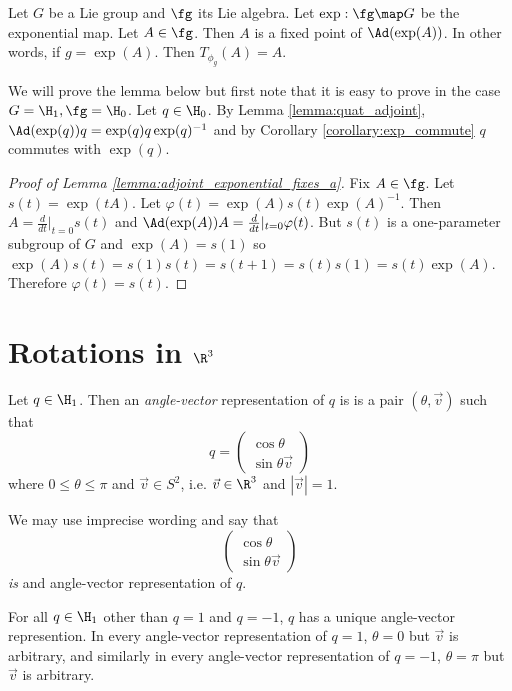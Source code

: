 \documentclass[oneside,12pt]{amsart}
\begin{document}
\begin{lemma}
\label{lemma:adjoint_exponential_fixes_a}
Let $G$ be a Lie group and $\fg$ its Lie algebra. Let $\exp:\fg\map G$ be the exponential map.
Let $A\in \fg$. Then $A$ is a fixed point of $\Ad(\exp(A))$.
In other words, if $g=\exp(A)$. Then $T_{\phi_g}(A) = A$. 
\end{lemma}

We will prove the lemma below but first note that it is easy to prove in the case
$G=\H_1, \fg = \H_0$.  Let $q\in\H_0$.
By Lemma \ref{lemma:quat_adjoint}, $\Ad(\exp(q))q = \exp(q) q  \exp(q)^{-1}$ and by
Corollary \ref{corollary:exp_commute} $q$ commutes with $\exp(q)$. 

\begin{proof}[Proof of Lemma \ref{lemma:adjoint_exponential_fixes_a}]
Fix $A\in\fg$. Let $s(t) = \exp(tA)$. Let $\varphi(t) = \exp(A) s(t) \exp(A)^{-1}$.
Then $A = \frac{d}{dt}\vert_{t=0} s(t)$ and $\Ad(\exp(A)) A = \frac{d}{dt}\vert_{t=0} \varphi(t)$.
But $s(t)$ is a one-parameter subgroup of $G$ and $\exp(A)=s(1)$ so $\exp(A) s(t) = s(1)s(t) = s(t+1) = s(t)s(1) = s(t)\exp(A)$. Therefore $\varphi(t)=s(t)$.
\end{proof}

\section{Rotations in $\R^3$}
\begin{definition}
Let $q\in\H_1$. Then an \emph{angle-vector} representation of $q$ is is a pair $(\theta,\vec{v})$ such that
$$q = \begin{pmatrix} \cos \theta \\ \sin \theta \vec{v} \end{pmatrix}$$
where $0\leq\theta\leq\pi$ and $\vec{v}\in S^2$, i.e. $\vec{v}\in\R^3$ and $|\vec{v}| = 1$.
\end{definition}

We may use imprecise wording and say that 
$$\begin{pmatrix} \cos \theta \\ \sin \theta \vec{v} \end{pmatrix}$$
\emph{is} and angle-vector representation of $q$.

\begin{remark}
For all $q\in\H_1$ other than $q=1$ and $q=-1$, $q$ has a unique angle-vector represention.
In every angle-vector representation of $q=1$, $\theta=0$ but $\vec{v}$ is arbitrary, and similarly
in every angle-vector representation of $q=-1$, $\theta=\pi$ but $\vec{v}$ is arbitrary.
\end{remark}
\end{document}
